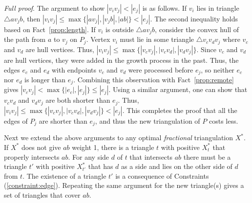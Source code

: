 \documentclass[final]{siamltex}
\newcommand{\edge}{e}
\newcommand{\polygon}{P}
\newcommand{\tri}{t}  \newcommand{\vertex}{v}
\newcommand{\fracTriang}{X}
\newenvironment{fullproof}{\par{\it Full proof}. \ignorespaces}{\endproof}
\begin{document}
\begin{fullproof}
The argument to show $|\vertex_i \vertex_j|< |\edge_j|$ is as follows.
If $\vertex_i$ lies in triangle $\triangle a \vertex_j b$, then
$|\vertex_i \vertex_j|\le \max\{|av_j|,|\vertex_j b|,|a b|\}< |\edge_j|$.
The second inequality holds based on Fact~\ref{prop:length}.
If $\vertex_i$ is outside $\triangle a \vertex_j b$, consider the convex hull of the path from 
$a$ to $\vertex_j$ on $\polygon_j$. 
Vertex $\vertex_i$ must lie in some triangle $\triangle \vertex_c \vertex_d \vertex_j$ where $\vertex_c$ and $\vertex_d$ are hull vertices. Thus, 
$|\vertex_i \vertex_j|\le \max\{|\vertex_c \vertex_j|,|\vertex_c \vertex_d|,|\vertex_d \vertex_j|\}$. Since $\vertex_c$ and $\vertex_d$ are hull vertices, 
they were added in the growth process in the past. Thus, the edges $\edge_c$ and $\edge_d$ with endpoints 
$\vertex_c$ and $\vertex_d$ were processed before $\edge_j$, so neither $\edge_c$ nor $\edge_d$ is longer
than $\edge_j$. Combining this observation with Fact~\ref{prop:remote} gives $|\vertex_c \vertex_j| < \max\{|\edge_c|,|\edge_j|\}\le|\edge_j|$. 
Using a similar argument, one can show that $\vertex_c \vertex_d$ and $\vertex_d \vertex_j$ are both shorter than $\edge_j$. 
Thus, $|\vertex_i \vertex_j|\le\max\{|\vertex_c \vertex_j|,|\vertex_c \vertex_d|,|\vertex_d \vertex_j|\} <|\edge_j|$. This completes the proof that 
all the edges of $\polygon_j$ are shorter than $\edge_j$, and thus the new triangulation of $\polygon$ costs less.

Next we extend the above arguments to any optimal {\em fractional} triangulation $\fracTriang^*$. 
If $\fracTriang^*$ does not give $a b$ weight 1,
there is a triangle $\tri$ with positive $\fracTriang^*_t$ that properly intersects $a b$.
For any side $d$ of $\tri$ that intersects $a b$ there must be a triangle $\tri'$ 
with positive $\fracTriang^*_{\tri'}$ that has $d$ as a side and lies on the other side of $d$ from $\tri$. 
The existence of a triangle $\tri'$ is a consequence of Constraints (\ref{constraint:edge}). 
Repeating the same argument for the new triangle(s) gives a set of triangles that cover $a b$. 


\end{fullproof}
\end{document}
